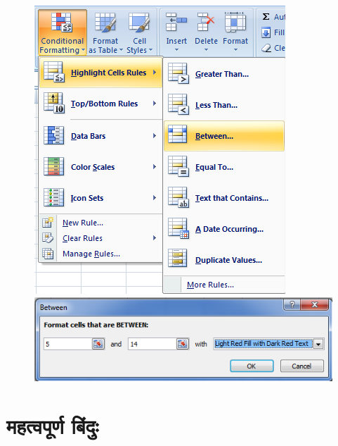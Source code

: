 \noindent
\begin{figure}[H]
\centering
\includegraphics[scale=0.44]{src/images/chapter2/chapter2_fig22.png}\quad
\includegraphics[scale=0.38]{src/images/chapter2/chapter2_fig23.png}
\end{figure}


\section*{महत्वपूर्ण बिंदुः}

